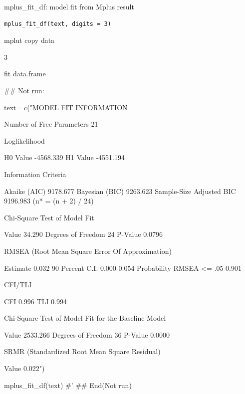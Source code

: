 \documentclass[a4paper]{book}
\begin{document}
%
\begin{Description}
mplus\_fit\_df: model fit from  Mplus result
\end{Description}
%
\begin{Usage}
\begin{verbatim}
mplus_fit_df(text, digits = 3)
\end{verbatim}
\end{Usage}
%
\begin{Arguments}
\begin{ldescription}
\item[\code{text}] mplut copy data

\item[\code{digits}] 3
\end{ldescription}
\end{Arguments}
%
\begin{Value}
fit data.frame
\end{Value}
%
\begin{Examples}
\begin{ExampleCode}


\#\# Not run: 


text= c("MODEL FIT INFORMATION

Number of Free Parameters                       21

Loglikelihood

          H0 Value                       -4568.339
          H1 Value                       -4551.194

Information Criteria

          Akaike (AIC)                    9178.677
          Bayesian (BIC)                  9263.623
          Sample-Size Adjusted BIC        9196.983
            (n* = (n + 2) / 24)

Chi-Square Test of Model Fit

          Value                             34.290
          Degrees of Freedom                    24
          P-Value                           0.0796

RMSEA (Root Mean Square Error Of Approximation)

          Estimate                           0.032
          90 Percent C.I.                    0.000  0.054
          Probability RMSEA <= .05           0.901

CFI/TLI

          CFI                                0.996
          TLI                                0.994

Chi-Square Test of Model Fit for the Baseline Model

          Value                           2533.266
          Degrees of Freedom                    36
          P-Value                           0.0000

SRMR (Standardized Root Mean Square Residual)

          Value                              0.022")

mplus_fit_df(text)
#' 
## End(Not run)
\end{ExampleCode}
\end{Examples}
\end{document}
